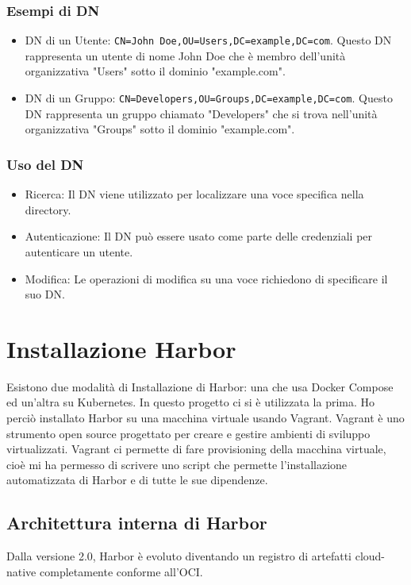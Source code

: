 \documentclass[12pt]{report}
\begin{document}
\subsection{Esempi di DN}
\begin{itemize}
    \item DN di un Utente: \texttt{CN=John Doe,OU=Users,DC=example,DC=com}. Questo DN rappresenta un utente di nome John Doe che è membro dell'unità organizzativa "Users" sotto il dominio "example.com".
    \item DN di un Gruppo: \texttt{CN=Developers,OU=Groups,DC=example,DC=com}. Questo DN rappresenta un gruppo chiamato "Developers" che si trova nell'unità organizzativa "Groups" sotto il dominio "example.com".
\end{itemize}
\subsection{Uso del DN}
\begin{itemize}
    \item Ricerca: Il DN viene utilizzato per localizzare una voce specifica nella directory.
    \item Autenticazione: Il DN può essere usato come parte delle credenziali per autenticare un utente.
    \item Modifica: Le operazioni di modifica su una voce richiedono di specificare il suo DN.
\end{itemize}

\chapter{Installazione Harbor}
Esistono due modalità di Installazione di Harbor: una che usa Docker Compose ed un'altra su Kubernetes. In questo progetto ci si è utilizzata la prima. Ho perciò installato Harbor su una macchina virtuale usando Vagrant. Vagrant è uno strumento open source progettato per creare e gestire ambienti di sviluppo virtualizzati. Vagrant ci permette di fare provisioning della macchina virtuale, cioè mi ha permesso di scrivere uno script che permette l'installazione automatizzata di Harbor e di tutte le sue dipendenze.
\section{Architettura interna di Harbor}
Dalla versione 2.0, Harbor è evoluto diventando un registro di artefatti cloud-native completamente conforme all'OCI.
\end{document}
